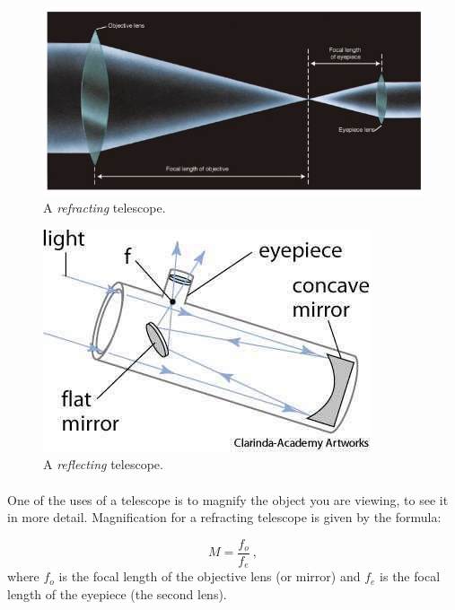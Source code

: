 \documentclass[12pt]{article}%
\begin{document}
\begin{figure}[ht!]
\begin{center}
\includegraphics[scale=.4]{Optics_fig3.png}
\caption{A \textit{refracting} telescope.}
\end{center}
\end{figure}
 
\begin{figure}[ht!]
\begin{center}
\includegraphics[scale=.6]{Optics_fig4.jpg}
\caption{A \textit{reflecting} telescope.}
\end{center}
\end{figure}
 
\paragraph{}
One of the uses of a telescope is to magnify the object you are viewing, to see it in more detail. Magnification for a refracting telescope is given by the formula:
 
\begin{equation}
M = \frac{f_o}{f_e} \ ,
\end{equation}
where $f_o$ is the focal length of the objective lens (or mirror) and $f_e$ is the focal length of the eyepiece (the second lens).
 
\end{document}
